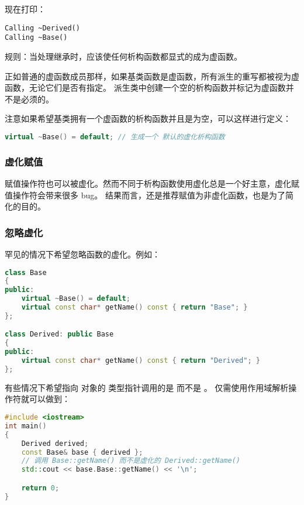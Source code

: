 \documentclass[../../LearnCpp.tex]{subfiles}
\begin{document}
现在打印：

\begin{lstlisting}
Calling ~Derived()
Calling ~Base()
\end{lstlisting}

规则：当处理继承时，应该使任何析构函数都显式的成为虚函数。

正如普通的虚函数成员那样，如果基类函数是虚函数，所有派生的重写都被视为虚函数，无论它们是否有指定。
派生类中创建一个空的析构函数并标记为虚函数并不是必须的。

注意如果希望基类拥有一个虚函数的析构函数并且是为空，可以这样进行定义：

\begin{lstlisting}[language=C++]
virtual ~Base() = default; // 生成一个 默认的虚化析构函数
\end{lstlisting}

\subsubsection*{虚化赋值}

赋值操作符也可以被虚化。然而不同于析构函数使用虚化总是一个好主意，虚化赋值操作符会带来很多 bug。
结果而言，还是推荐赋值为非虚化函数，也是为了简化的目的。

\subsubsection*{忽略虚化}

罕见的情况下希望忽略函数的虚化。例如：

\begin{lstlisting}[language=C++]
class Base
{
public:
    virtual ~Base() = default;
    virtual const char* getName() const { return "Base"; }
};

class Derived: public Base
{
public:
    virtual const char* getName() const { return "Derived"; }
};
\end{lstlisting}

有些情况下希望指向  对象的  类型指针调用的是  而不是 。
仅需使用作用域解析操作符就可以做到：

\begin{lstlisting}[language=C++]
#include <iostream>
int main()
{
    Derived derived;
    const Base& base { derived };
    // 调用 Base::getName() 而不是虚化的 Derived::getName()
    std::cout << base.Base::getName() << '\n';

    return 0;
}
\end{lstlisting}
\end{document}
